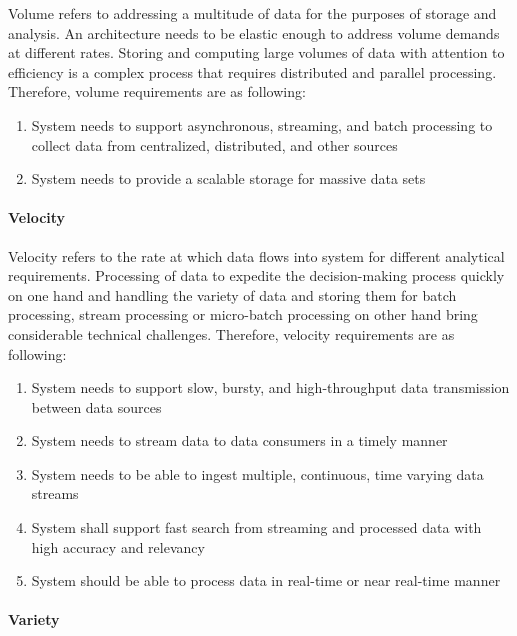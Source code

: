 \documentclass{bmcart}
\begin{document}
Volume refers to addressing a multitude of data for the purposes of storage and analysis. An architecture needs to be elastic enough to address volume demands at different rates. Storing and computing large volumes of data with attention to efficiency is a complex process that requires distributed and parallel processing. Therefore, volume requirements are as following:


\begin{enumerate}[label=\textbf{Vol-\arabic*}]
    \item System needs to support asynchronous, streaming, and batch processing to collect data from centralized, distributed, and other sources
    \item System needs to provide a scalable storage for massive data sets
\end{enumerate}


\paragraph{Velocity}

Velocity refers to the rate at which data flows into system for different analytical requirements. Processing of data to expedite the decision-making process quickly on one hand and handling the variety of data and storing them for batch processing, stream processing or micro-batch processing on other hand bring considerable technical challenges. Therefore, velocity requirements are as following: 

\begin{enumerate}[label=\textbf{Vel-\arabic*}]
    \item System needs to support slow, bursty, and high-throughput data transmission between data sources
    \item System needs to stream data to data consumers in a timely manner
    \item System needs to be able to ingest multiple, continuous, time varying data streams
    \item System shall support fast search from streaming and processed data with high accuracy and relevancy
    \item System should be able to process data in real-time or near real-time manner
\end{enumerate}


\paragraph{Variety}
\end{document}
